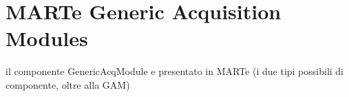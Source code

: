 
\chapter{MARTe Generic Acquisition Modules}


il componente GenericAcqModule e presentato in MARTe
(i due tipi possibili di componente, oltre alla GAM)
